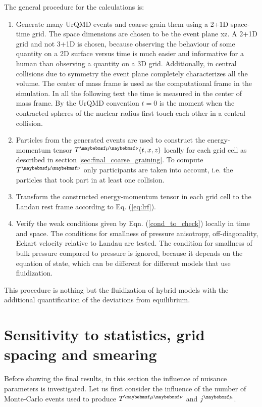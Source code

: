The general procedure for the calculations is:
\begin{enumerate}
\item Generate many UrQMD events and coarse-grain them using a 2+1D space-time
  grid. The space dimensions are chosen to be the event plane xz. A 2+1D grid
  and not 3+1D is chosen, because observing the behaviour of some quantity on a 2D
  surface versus time is much easier and informative for a human than observing
  a quantity on a 3D grid.  Additionally, in central collisions due to symmetry the
  event plane completely characterizes all the volume. The center of mass frame
  is used as the computational frame in the simulation.  In all the following
  text the time is measured in the center of mass frame.  By the UrQMD convention
  $t = 0$ is the moment when the contracted spheres of the nuclear radius first
  touch each other in a central collision.
\item Particles from the generated events are used to construct the
  energy-momentum tensor $\Tmn(t,x,z)$ locally for each grid cell as described in
  section \ref{sec:final_coarse_graining}. To compute $\Tmn$ only participants
  are taken into account, i.e. the particles that took part in at least one
  collision.
\item Transform the constructed energy-momentum tensor in each grid cell to the
  Landau rest frame according to Eq. (\ref{eq:lrf}).
\item Verify the weak conditions given by Eqn. (\ref{cond_to_check})
  locally in time and space. The conditions for smallness of pressure
  anisotropy, off-diagonality, Eckart velocity relative to Landau are tested. The
  condition for smallness of bulk pressure compared to pressure is ignored, because
  it depends on the equation of state, which can be different for different
  models that use fluidization.
\end{enumerate}

This procedure is nothing but the fluidization of hybrid models with the
additional quantification of the deviations from equilibrium.

\section{Sensitivity to statistics, grid spacing and smearing}\label{Sec_V}

Before showing the final results, in this section the influence of nuisance
parameters is investigated. Let us first consider the influence of the number
of Monte-Carlo events used to produce $\Tmn$ and $\jmu$.

